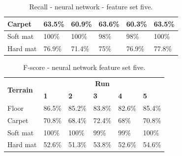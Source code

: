 \documentclass[USenglish]{ifimaster}  %
\begin{document}
\begin{table}[h]
\begin{subtable}[h]{1\textwidth}
\begin{tabular}{@{}llllll@{}}
			\multicolumn{1}{l|}{Carpet} & \multicolumn{1}{l|}{63.5\%} & \multicolumn{1}{l|}{60.9\%} & \multicolumn{1}{l|}{63.6\%} & \multicolumn{1}{l|}{60.3\%} & 63.5\% \\ \midrule
			\multicolumn{1}{l|}{Soft mat} & \multicolumn{1}{l|}{100\%} & \multicolumn{1}{l|}{100\%} & \multicolumn{1}{l|}{98\%} & \multicolumn{1}{l|}{98\%} & 100\% \\ \midrule
			\multicolumn{1}{l|}{Hard mat} & \multicolumn{1}{l|}{76.9\%} & \multicolumn{1}{l|}{71.4\%} & \multicolumn{1}{l|}{75\%} & \multicolumn{1}{l|}{76.9\%} & 77.8\% \\ \bottomrule
		\end{tabular}
		\caption{Recall - neural network - feature set five.}
		\label{tab:nnset53}
	\end{subtable}
\end{table}
\begin{table}[h]\ContinuedFloat
	\begin{subtable}[h]{1\textwidth}
		\centering
		\captionsetup{justification=centering}
			\begin{tabular}{@{}llllll@{}}
			\toprule
			\multirow{2}{*}{\textbf{Terrain}} & \multicolumn{5}{c}{\textbf{Run}} \\ \cmidrule(l){2-6} 
			& \multicolumn{1}{l|}{\textbf{1}} & \multicolumn{1}{l|}{\textbf{2}} & \multicolumn{1}{l|}{\textbf{3}} & \multicolumn{1}{l|}{\textbf{4}} & \textbf{5} \\ \midrule
			\multicolumn{1}{l|}{Floor} & \multicolumn{1}{l|}{86.5\%} & \multicolumn{1}{l|}{85.2\%} & \multicolumn{1}{l|}{83.8\%} & \multicolumn{1}{l|}{82.6\%} & 85.4\% \\ \midrule
			\multicolumn{1}{l|}{Carpet} & \multicolumn{1}{l|}{70.8\%} & \multicolumn{1}{l|}{68.4\%} & \multicolumn{1}{l|}{72.4\%} & \multicolumn{1}{l|}{68\%} & 70.8\% \\ \midrule
			\multicolumn{1}{l|}{Soft mat} & \multicolumn{1}{l|}{100\%} & \multicolumn{1}{l|}{100\%} & \multicolumn{1}{l|}{99\%} & \multicolumn{1}{l|}{99\%} & 100\% \\ \midrule
			\multicolumn{1}{l|}{Hard mat} & \multicolumn{1}{l|}{52.6\%} & \multicolumn{1}{l|}{51.3\%} & \multicolumn{1}{l|}{53.8\%} & \multicolumn{1}{l|}{52.6\%} & 54.6\% \\ \bottomrule
		\end{tabular}
		\caption{F-score - neural network feature set five.}
		\label{tab:nnset5fscore}
	\end{subtable}
\end{table}
\end{document}
